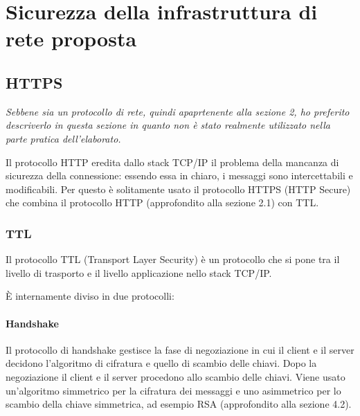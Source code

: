 \documentclass{article}
\begin{document}
\section{Sicurezza della infrastruttura di rete proposta}

\subsection{HTTPS}

\textit{Sebbene sia un protocollo di rete, quindi apaprtenente alla sezione 2, ho preferito descriverlo in questa sezione in quanto non è stato realmente utilizzato nella parte pratica dell'elaborato.}
\vspace{1em}

Il protocollo HTTP eredita dallo stack TCP/IP il problema della mancanza di sicurezza della connessione: essendo essa in chiaro, i messaggi sono intercettabili e modificabili. Per questo è solitamente usato il protocollo HTTPS (HTTP Secure) che combina il protocollo HTTP (approfondito alla sezione 2.1) con TTL.

\subsubsection{TTL}

Il protocollo TTL (Transport Layer Security) è un protocollo che si pone tra il livello di trasporto e il livello applicazione nello stack TCP/IP.

È internamente diviso in due protocolli:

\paragraph{Handshake}
Il protocollo di handshake gestisce la fase di negoziazione in cui il client e il server decidono l'algoritmo di cifratura e quello di scambio delle chiavi. Dopo la negoziazione il client e il server procedono allo scambio delle chiavi. Viene usato un'algoritmo simmetrico per la cifratura dei messaggi e uno asimmetrico per lo scambio della chiave simmetrica, ad esempio RSA (approfondito alla sezione 4.2).
\end{document}
